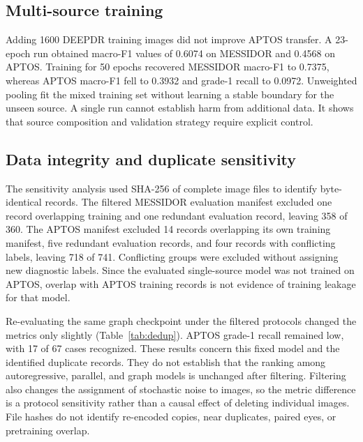 \documentclass[a4paper,fleqn]{cas-sc}
\begin{document}
\subsection{Multi-source training}

Adding 1600 DEEPDR training images did not improve APTOS transfer. A 23-epoch run obtained macro-F1 values of 0.6074 on MESSIDOR and 0.4568 on APTOS. Training for 50 epochs recovered MESSIDOR macro-F1 to 0.7375, whereas APTOS macro-F1 fell to 0.3932 and grade-1 recall to 0.0972. Unweighted pooling fit the mixed training set without learning a stable boundary for the unseen source. A single run cannot establish harm from additional data. It shows that source composition and validation strategy require explicit control.

\subsection{Data integrity and duplicate sensitivity}

The sensitivity analysis used SHA-256 of complete image files to identify byte-identical records. The filtered MESSIDOR evaluation manifest excluded one record overlapping training and one redundant evaluation record, leaving 358 of 360. The APTOS manifest excluded 14 records overlapping its own training manifest, five redundant evaluation records, and four records with conflicting labels, leaving 718 of 741. Conflicting groups were excluded without assigning new diagnostic labels. Since the evaluated single-source model was not trained on APTOS, overlap with APTOS training records is not evidence of training leakage for that model.

Re-evaluating the same graph checkpoint under the filtered protocols changed the metrics only slightly (Table~\ref{tab:dedup}). APTOS grade-1 recall remained low, with 17 of 67 cases recognized. These results concern this fixed model and the identified duplicate records. They do not establish that the ranking among autoregressive, parallel, and graph models is unchanged after filtering. Filtering also changes the assignment of stochastic noise to images, so the metric difference is a protocol sensitivity rather than a causal effect of deleting individual images. File hashes do not identify re-encoded copies, near duplicates, paired eyes, or pretraining overlap.
\end{document}
